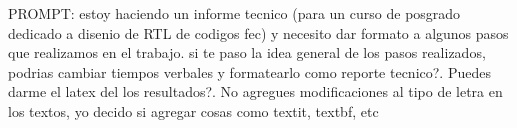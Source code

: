 PROMPT: estoy haciendo un informe tecnico (para un curso de posgrado dedicado a disenio de RTL de codigos fec) y necesito dar formato a algunos pasos que realizamos en el trabajo. si te paso la idea general de los pasos realizados, podrias cambiar tiempos verbales y formatearlo como reporte tecnico?.
Puedes darme el latex del los resultados?. No agregues modificaciones al tipo de letra en los textos, yo decido si agregar cosas como textit, textbf, etc




